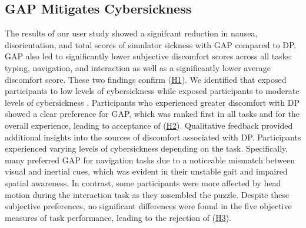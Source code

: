 \subsection{GAP Mitigates Cybersickness}
The results of our user study showed a signifcant reduction in  nausea, disorientation, and total scores of simulator sickness with GAP compared to DP. GAP also led to significantly lower subjective discomfort scores across all tasks: typing, navigation, and interaction as well as a significantly lower average discomfort score. These two findings confirm (\hyperlink{hypo:H1}{H1}). We identified that \GAP exposed participants to low levels of cybersickness while \DP exposed participants to moderate levels of cybersickness \cite{hale2014handbook,stanney2020identifying}. 
Participants who experienced greater discomfort with DP showed a clear preference for GAP, which was ranked first in all tasks and for the overall experience, leading to
acceptance of (\hyperlink{hypo:H2}{H2}). Qualitative feedback provided additional insights into the sources of discomfort associated with DP. Participants experienced varying levels of cybersickness depending on the task. Specifically, many preferred GAP for navigation tasks due to a noticeable mismatch between visual and inertial cues, which was evident in their unstable gait and impaired spatial awareness. In contrast, some participants were more affected by head motion during the interaction task as they assembled the puzzle. Despite these subjective preferences, no significant differences were found in the five objective measures of task performance, leading to the rejection of (\hyperlink{hypo:H3}{H3}).
